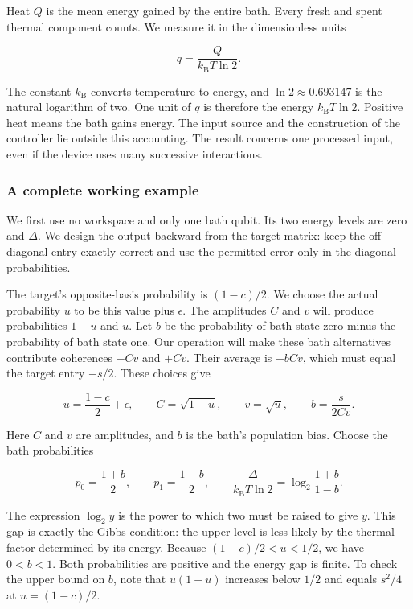 \documentclass[11pt,letterpaper]{article}
\begin{document}
Heat \(Q\) is the mean energy gained by the entire bath. Every fresh and spent thermal component counts. We measure it in the dimensionless units

\[q = \frac{Q}{k_{\mathrm{B}}T\ln 2}.\]

The constant \(k_{\mathrm{B}}\) converts temperature to energy, and \(\ln 2 \approx 0.693147\) is the natural logarithm of two. One unit of \(q\) is therefore the energy \(k_{\mathrm{B}}T\ln 2\). Positive heat means the bath gains energy. The input source and the construction of the controller lie outside this accounting. The result concerns one processed input, even if the device uses many successive interactions.

\subsubsection{A complete working example}\label{a-complete-working-example}

We first use no workspace and only one bath qubit. Its two energy levels are zero and \(\Delta\). We design the output backward from the target matrix: keep the off-diagonal entry exactly correct and use the permitted error only in the diagonal probabilities.

The target's opposite-basis probability is \((1 - c)/2\). We choose the actual probability \(u\) to be this value plus \(\epsilon\). The amplitudes \(C\) and \(v\) will produce probabilities \(1 - u\) and \(u\). Let \(b\) be the probability of bath state zero minus the probability of bath state one. Our operation will make these bath alternatives contribute coherences \(- Cv\) and \(+ Cv\). Their average is \(- bCv\), which must equal the target entry \(- s/2\). These choices give

\[u = \frac{1 - c}{2} + \epsilon,\quad\quad C = \sqrt{1 - u},\quad\quad v = \sqrt{u},\quad\quad b = \frac{s}{2Cv}.\]

Here \(C\) and \(v\) are amplitudes, and \(b\) is the bath's population bias. Choose the bath probabilities

\[p_{0} = \frac{1 + b}{2},\quad\quad p_{1} = \frac{1 - b}{2},\quad\quad\frac{\Delta}{k_{\mathrm{B}}T\ln 2} = \log_{2}\frac{1 + b}{1 - b}.\]

\clearpage
The expression \(\log_{2}y\) is the power to which two must be raised to give \(y\). This gap is exactly the Gibbs condition: the upper level is less likely by the thermal factor determined by its energy. Because \((1 - c)/2 < u < 1/2\), we have \(0 < b < 1\). Both probabilities are positive and the energy gap is finite. To check the upper bound on \(b\), note that \(u(1 - u)\) increases below \(1/2\) and equals \(s^{2}/4\) at \(u = (1 - c)/2\).
\end{document}
